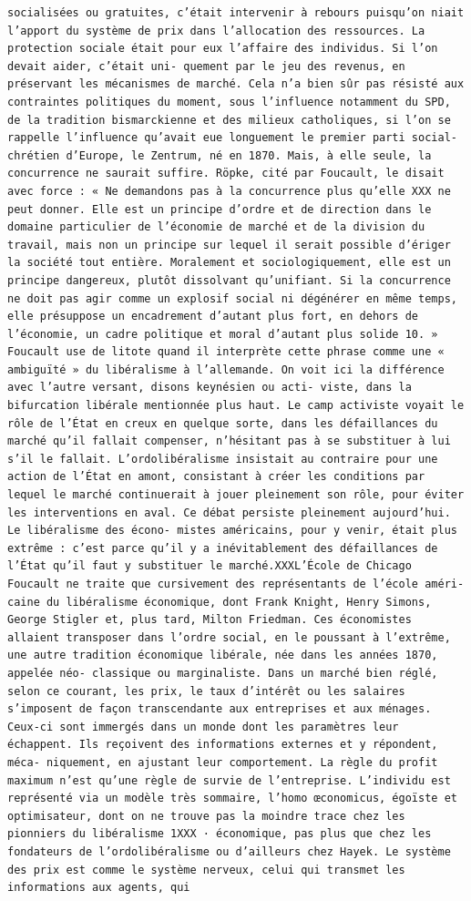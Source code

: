 \documentclass[
]{book}
\begin{document}
\begin{verbatim}
socialisées ou gratuites, c’était intervenir à rebours puisqu’on niait l’apport du système de prix dans l’allocation des ressources. La protection sociale était pour eux l’affaire des individus. Si l’on devait aider, c’était uni- quement par le jeu des revenus, en préservant les mécanismes de marché. Cela n’a bien sûr pas résisté aux contraintes politiques du moment, sous l’influence notamment du SPD, de la tradition bismarckienne et des milieux catholiques, si l’on se rappelle l’influence qu’avait eue longuement le premier parti social-chrétien d’Europe, le Zentrum, né en 1870. Mais, à elle seule, la concurrence ne saurait suffire. Röpke, cité par Foucault, le disait avec force : « Ne demandons pas à la concurrence plus qu’elle XXX ne peut donner. Elle est un principe d’ordre et de direction dans le domaine particulier de l’économie de marché et de la division du travail, mais non un principe sur lequel il serait possible d’ériger la société tout entière. Moralement et sociologiquement, elle est un principe dangereux, plutôt dissolvant qu’unifiant. Si la concurrence ne doit pas agir comme un explosif social ni dégénérer en même temps, elle présuppose un encadrement d’autant plus fort, en dehors de l’économie, un cadre politique et moral d’autant plus solide 10. » Foucault use de litote quand il interprète cette phrase comme une « ambiguïté » du libéralisme à l’allemande. On voit ici la différence avec l’autre versant, disons keynésien ou acti- viste, dans la bifurcation libérale mentionnée plus haut. Le camp activiste voyait le rôle de l’État en creux en quelque sorte, dans les défaillances du marché qu’il fallait compenser, n’hésitant pas à se substituer à lui s’il le fallait. L’ordolibéralisme insistait au contraire pour une action de l’État en amont, consistant à créer les conditions par lequel le marché continuerait à jouer pleinement son rôle, pour éviter les interventions en aval. Ce débat persiste pleinement aujourd’hui. Le libéralisme des écono- mistes américains, pour y venir, était plus extrême : c’est parce qu’il y a inévitablement des défaillances de l’État qu’il faut y substituer le marché.XXXL’École de Chicago Foucault ne traite que cursivement des représentants de l’école améri- caine du libéralisme économique, dont Frank Knight, Henry Simons, George Stigler et, plus tard, Milton Friedman. Ces économistes allaient transposer dans l’ordre social, en le poussant à l’extrême, une autre tradition économique libérale, née dans les années 1870, appelée néo- classique ou marginaliste. Dans un marché bien réglé, selon ce courant, les prix, le taux d’intérêt ou les salaires s’imposent de façon transcendante aux entreprises et aux ménages. Ceux-ci sont immergés dans un monde dont les paramètres leur échappent. Ils reçoivent des informations externes et y répondent, méca- niquement, en ajustant leur comportement. La règle du profit maximum n’est qu’une règle de survie de l’entreprise. L’individu est représenté via un modèle très sommaire, l’homo œconomicus, égoïste et optimisateur, dont on ne trouve pas la moindre trace chez les pionniers du libéralisme 1XXX · économique, pas plus que chez les fondateurs de l’ordolibéralisme ou d’ailleurs chez Hayek. Le système des prix est comme le système nerveux, celui qui transmet les informations aux agents, qui 
\end{verbatim}
\end{document}
